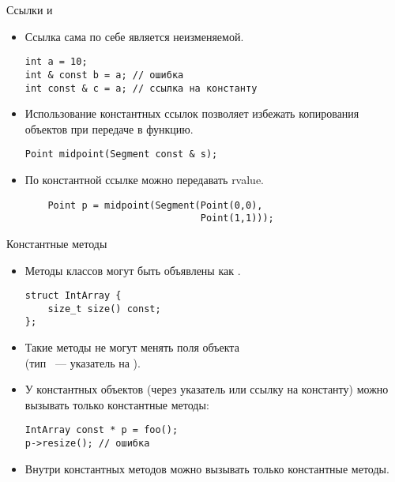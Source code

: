 \documentclass{beamer}
\begin{document}
\begin{frame}[fragile]{Ссылки и }{}
    \begin{itemize}
        \item Ссылка сама по себе является неизменяемой.
\begin{lstlisting}
int a = 10;
int & const b = a; // ошибка
int const & c = a; // ссылка на константу
\end{lstlisting}
        \item Использование константных ссылок позволяет избежать
            копирования объектов при передаче в функцию.
\begin{lstlisting}
Point midpoint(Segment const & s);
\end{lstlisting}
        \item По константной ссылке можно передавать rvalue.
\begin{lstlisting}
    Point p = midpoint(Segment(Point(0,0), 
                               Point(1,1)));
\end{lstlisting}
    \end{itemize}
\end{frame}

\begin{frame}[fragile]{Константные методы}{}
    \begin{itemize}
        \item Методы классов могут быть объявлены как .
\begin{lstlisting}
struct IntArray {
    size_t size() const;
};
\end{lstlisting}
        \item Такие методы не могут менять поля объекта\\
            (тип ~--- указатель на ).

        \item У константных объектов (через указатель или ссылку на константу)
            можно вызывать только константные методы:

\begin{lstlisting}
IntArray const * p = foo();
p->resize(); // ошибка
\end{lstlisting}
        \item Внутри константных методов можно вызывать только константные методы.

    \end{itemize}
\end{frame}
\end{document}
